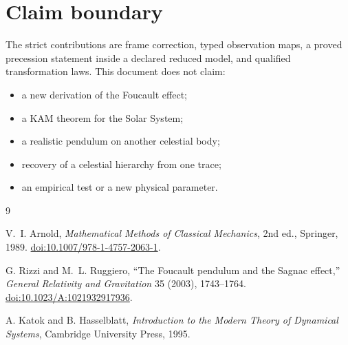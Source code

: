 \documentclass[11pt,a4paper]{article}
\theoremstyle{definition}
\theoremstyle{plain}
\theoremstyle{remark}
\begin{document}
\section{Claim boundary}

The strict contributions are frame correction, typed observation
maps, a proved precession statement inside a declared reduced model,
and qualified transformation laws. This document does not claim:
\begin{itemize}
  \item a new derivation of the Foucault effect;
  \item a KAM theorem for the Solar System;
  \item a realistic pendulum on another celestial body;
  \item recovery of a celestial hierarchy from one trace;
  \item an empirical test or a new physical parameter.
\end{itemize}

\begingroup
{}
\begin{thebibliography}{9}

V.~I. Arnold, \emph{Mathematical Methods of Classical Mechanics},
2nd ed., Springer, 1989.
\href{https://doi.org/10.1007/978-1-4757-2063-1}
{doi:10.1007/978-1-4757-2063-1}.

G. Rizzi and M.~L. Ruggiero, ``The Foucault pendulum and the Sagnac
effect,'' \emph{General Relativity and Gravitation} 35 (2003),
1743--1764.
\href{https://doi.org/10.1023/A:1021932917936}
{doi:10.1023/A:1021932917936}.

A. Katok and B. Hasselblatt,
\emph{Introduction to the Modern Theory of Dynamical Systems},
Cambridge University Press, 1995.

\end{thebibliography}
\endgroup
\end{document}
